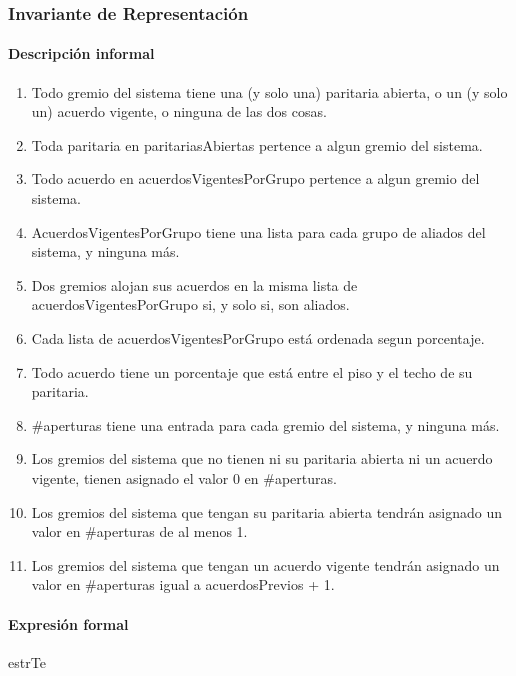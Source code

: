 \subsubsection{Invariante de Representaci\'on}

\paragraph{Descripción informal}
\begin{enumerate}

	\item Todo gremio del sistema tiene una (y solo una) paritaria abierta, o un (y solo un) acuerdo vigente, o ninguna de las dos cosas.
	\item Toda paritaria en paritariasAbiertas pertence a algun gremio del sistema.
	\item Todo acuerdo en acuerdosVigentesPorGrupo pertence a algun gremio del sistema.
	\item AcuerdosVigentesPorGrupo tiene una lista para cada grupo de aliados del sistema, y ninguna más.
	\item Dos gremios alojan sus acuerdos en la misma lista de acuerdosVigentesPorGrupo si, y solo si, son aliados.
	\item Cada lista de acuerdosVigentesPorGrupo está ordenada segun porcentaje.
	\item Todo acuerdo tiene un porcentaje que está entre el piso y el techo de su paritaria.
	\item \#aperturas tiene una entrada para cada gremio del sistema, y ninguna más.
	\item Los gremios del sistema que no tienen ni su paritaria abierta ni un acuerdo vigente, tienen asignado el valor 0 en \#aperturas.
	\item Los gremios del sistema que tengan su paritaria abierta tendrán asignado un valor en \#aperturas de al menos 1.
	\item Los gremios del sistema que tengan un acuerdo vigente tendrán asignado un valor en \#aperturas igual a acuerdosPrevios + 1.

\end{enumerate}

\paragraph{Expresión formal \\}
\begin{RepFormal}{estrT}{e}
\end{RepFormal}

